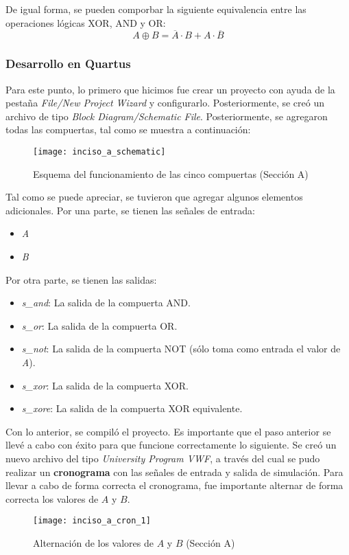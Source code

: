 \documentclass[../procedimientos.tex]{subfiles}
\begin{document}
De igual forma, se pueden comporbar la siguiente equivalencia entre las 
operaciones lógicas XOR, AND y OR:
\begin{equation}
  A \oplus B = \overline{A} \cdot B + A \cdot \overline{B}
\end{equation}

\subsubsection{Desarrollo en Quartus}
Para este punto, lo primero que hicimos fue crear un proyecto con ayuda de la 
pestaña \textit{File/New Project Wizard} y configurarlo. Posteriormente, se 
creó un archivo de tipo \textit{Block Diagram/Schematic File}. Posteriormente, 
se agregaron todas las compuertas, tal como se muestra a continuación:
\begin{figure}[H]
  \centering
  \texttt{[image: inciso\_a\_schematic]}
  \caption{Esquema del funcionamiento de las cinco compuertas (Sección A)}
\end{figure}

Tal como se puede apreciar, se tuvieron que agregar algunos elementos 
adicionales. Por una parte, se tienen las señales de entrada:
\begin{itemize}
  \item \textit{A}
  \item \textit{B}
\end{itemize}

Por otra parte, se tienen las salidas:
\begin{itemize}
  \item \textit{s\_and}: La salida de la compuerta AND.
  \item \textit{s\_or}: La salida de la compuerta OR.
  \item \textit{s\_not}: La salida de la compuerta NOT (sólo toma como entrada 
    el valor de \textit{A}).
  \item \textit{s\_xor}: La salida de la compuerta XOR.
  \item \textit{s\_xore}: La salida de la compuerta XOR equivalente.
\end{itemize}

Con lo anterior, se compiló el proyecto. Es importante que el paso anterior se 
llevé a cabo con éxito para que funcione correctamente lo siguiente. Se creó 
un nuevo archivo del tipo \textit{University Program VWF}, a través del cual 
se pudo realizar un \textbf{cronograma} con las señales de entrada y salida de 
simulación. Para llevar a cabo de forma correcta el cronograma, fue importante 
alternar de forma correcta los valores de $A$ y $B$.
\begin{figure}[H]
  \centering
  \texttt{[image: inciso\_a\_cron\_1]}
  \caption{Alternación de los valores de $A$ y $B$ (Sección A)}
  \label{fig:variables_cron_a}
\end{figure}
\end{document}
